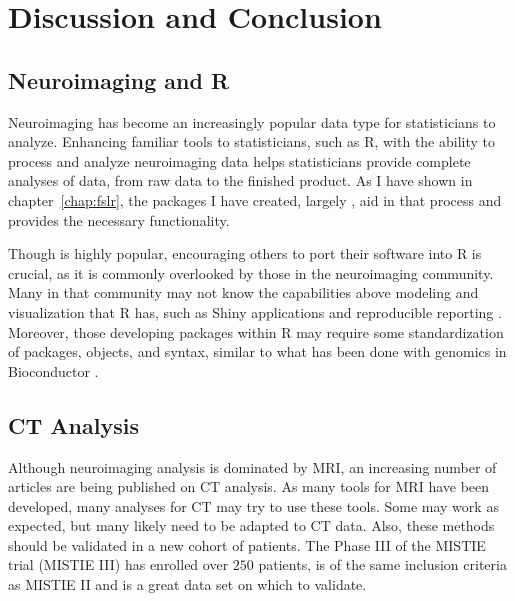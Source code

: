 \chapter{Discussion and Conclusion}
\label{chap:conclusion}

\section{Neuroimaging and R}
Neuroimaging has become an increasingly popular data type for statisticians to analyze.  Enhancing familiar tools to statisticians, such as R, with the ability to process and analyze neuroimaging data helps statisticians provide complete analyses of data, from raw data to the finished product.  As I have shown in chapter~\ref{chap:fslr}, the packages I have created, largely , aid in that process and provides the necessary functionality.  

Though  is highly popular, encouraging others to port their software into R is crucial, as it is commonly overlooked by those in the neuroimaging community.  Many in that community may not know the capabilities above modeling and visualization that R has, such as Shiny applications and reproducible reporting \cite{knitr_pack, knitr_dyn, knitr_book}.  Moreover, those developing packages within R may require some standardization of packages, objects, and syntax, similar to what has been done with genomics in Bioconductor \citep{bioc}.  

\section{CT Analysis}
Although neuroimaging analysis is dominated by MRI, an increasing number of articles are being published on CT analysis.  As many tools for MRI have been developed, many analyses for CT may try to use these tools.  Some may work as expected, but many likely need to be adapted to CT data.  Also, these methods should be validated in a new cohort of patients.  The Phase III of the MISTIE trial (MISTIE III) has enrolled over $250$ patients, is of the same inclusion criteria as MISTIE II and is a great data set on which to validate.

 
